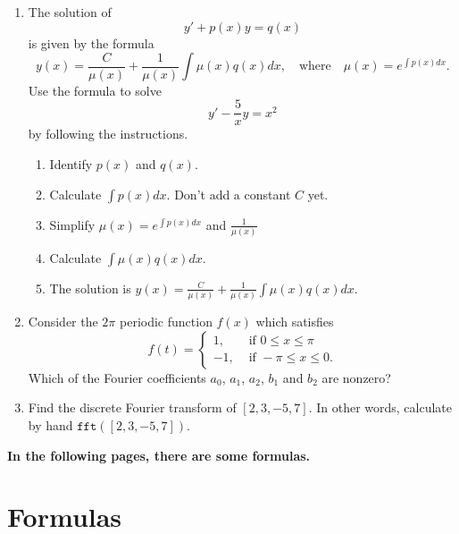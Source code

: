 \documentclass[12pt]{article}
\newcommand{\ratkaisu}[1]{{\color{blue}\quad\textrm{Solution } #1}}
\renewcommand{\ratkaisu}[1]{}
\begin{document}
\begin{enumerate}
\item The solution of
$$
y'+p(x)y=q(x)
$$
is given by the formula
$$
y(x)=\frac{C}{\mu(x)}+\frac{1}{\mu(x)}\int \mu(x)q(x)dx,\quad\textrm{where}\quad
\mu(x)=e^{\int p(x)dx}.
$$
Use the formula to solve
$$
y'-\frac{5}{x}y=x^2
$$
by following the instructions.
\begin{enumerate}
\item Identify $p(x)$ and $q(x)$.\ratkaisu{$p(x)=-\frac{5}{x}$ and $q(x)=x^2$}
\item Calculate $\int p(x)dx$. Don't add a constant $C$ yet.\ratkaisu{$\int p(x)dx=-5\ln(x)$}
\item Simplify $\mu(x)=e^{\int p(x)dx}$ and $\frac{1}{\mu(x)}$\ratkaisu{$\mu(x)=\frac{1}{x^5}$ and $\frac{1}{\mu(x)}=x^5$}
\item Calculate $\int \mu(x)q(x)dx$.
\ratkaisu{$-\frac{1}{2x^2}$}
\item The solution is $y(x)=\frac{C}{\mu(x)}+\frac{1}{\mu(x)}\int \mu(x)q(x)dx$.
\ratkaisu{$y(x)=Cx^5-\frac12 x^3$}
\end{enumerate}

\item Consider the $2\pi$ periodic function $f(x)$ which satisfies
$$
f(t)
=\begin{cases}
1,&\textrm{ if }0\leq x\leq \pi\\
-1,&\textrm{ if }-\pi\leq x\leq 0.
\end{cases}
$$
Which of the Fourier coefficients $a_0$, $a_1$, $a_2$, $b_1$ and $b_2$ are nonzero?\ratkaisu{Because $f(-x)=-f(x)$, the function $f$ is odd and the list of formulas gives
$$
f(x)
=\sum_{n=1}^\infty b_n\sin(nx),
\quad\textrm{where}\quad
b_n=\frac{2}{\pi}\int_{0}^{\pi}
f(x)\sin(nx)dx
$$
Therefore, $a_0=a_1=a_2=0$. Moreover,
$$
b_1=\frac{2}{\pi}\int_{0}^{\pi}
\sin(x)dx
=\frac{2}{\pi}(\cos(0)-\cos(\pi))=\frac{4}{\pi},
$$
which is nonzero. Moreover,
$$
b_2=\frac{2}{\pi}\int_{0}^{\pi}
\sin(2x)dx
=\frac{2}{\pi}\frac{1}{2}(\cos(2\cdot 0)-\cos(2\cdot \pi))=0.
$$
}

\item Find the discrete Fourier transform of $[2,3,-5,7]$. In other words, calculate by hand $\texttt{fft}([2,3,-5,7])$.
\ratkaisu{$\texttt{fft}([2,3])=[7,7+4i,-13,7-4i]$}
\end{enumerate}

\textbf{In the following pages, there are some formulas.}

\newpage
\section*{Formulas}
\end{document}
